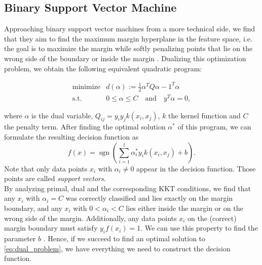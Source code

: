 \subsection{Binary Support Vector Machine}


Approaching binary support vector machines from a more technical side, we find that they aim to find the maximum margin hyperplane in the feature space, i.e. the goal is to maximize the margin while softly penalizing points that lie on the wrong side of the boundary or inside the margin \cite{Bishop2006}. Dualizing this optimization problem, we obtain the following equivalent quadratic program:

\begin{eqnarray}\label{eq:dual_problem}
	\text{minimize} & d(\alpha) := \frac{1}{2} \alpha^T Q \alpha - 1^T \alpha  \\ 
	\nonumber
	\text{s.t.} &  0 \leq \alpha \leq C  \quad \text{and} \quad 	y^T \alpha = 0,
\end{eqnarray}

where $\alpha$ is the dual variable, $Q_{ij} = y_i y_j k(x_i,x_j)$, $k$ the kernel function and $C $ the penalty term.
After finding the optimal solution $\alpha^*$ of this program, we can formulate the resulting decision function as
\begin{equation*}
f(x) = \operatorname{sgn}\left(\sum_{i=1}^{l}\alpha^*_i y_i k(x_i,x_j)+b\right).
\end{equation*}
Note that only data points $x_i$ with $\alpha_i \neq 0$ appear in the decision function. Those points are called \textit{support vectors}.\\
By analyzing primal, dual and the corresponding KKT conditions, we find that any $x_i$ with $\alpha_i = C$ was correctly classified and lies exactly on the margin boundary, and any $x_i$ with $0<\alpha_i < C$ lies either inside the margin or on the wrong side of the margin. Additionally, any data points $x_i$ on the (correct) margin boundary must satisfy $y_i f(x_i) = 1$. We can use this property to find the parameter $b$ \cite{Bishop2006}. Hence, if we succeed to find an optimal solution to \eqref{eq:dual_problem}, we have everything we need to construct the decision function.

